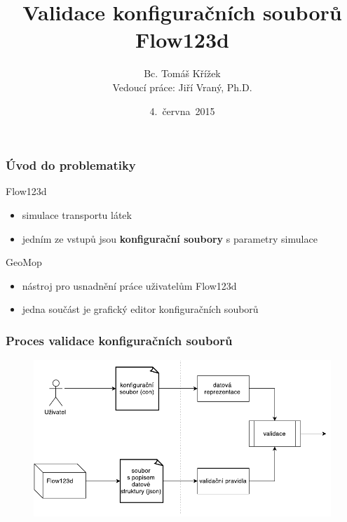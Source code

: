 \documentclass{beamer}
\begin{document}

\title{Validace konfiguračních souborů Flow123d}
\author[Bc. Tomáš Křížek]{{\large Bc. Tomáš Křížek}\\{\scriptsize Vedoucí práce: Jiří Vraný, Ph.D.}}
\date{4.~června~2015}

\begin{frame}
	\titlepage
\end{frame}

\begin{frame}
	\frametitle{Úvod do problematiky}
	\begin{block}{Flow123d}
		\begin{itemize}
			\item simulace transportu látek
			\item jedním ze vstupů jsou \textbf{konfigurační soubory} s parametry simulace
		\end{itemize}
	\end{block}

	\begin{block}{GeoMop}
		\begin{itemize}
			\item nástroj pro usnadnění práce uživatelům Flow123d
			\item jedna součást je grafický editor konfiguračních souborů
		\end{itemize}
	\end{block}
\end{frame}

\begin{frame}
	\frametitle{Proces validace konfiguračních souborů}
	\begin{figure}[h]
		\centering
		\includegraphics[width=\linewidth]{con_validation.pdf}
	\end{figure}
\end{frame}
\end{document}
